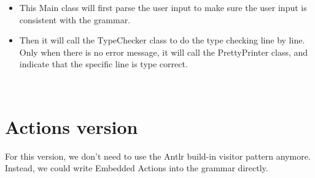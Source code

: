 \documentclass[a4paper,12pt,titlepage]{article}
\begin{document}
\begin{itemize}
	\item This Main class will first parse the user input to make sure the user input is consistent with the grammar.
	\item Then it will call the  {\footnotesize\ttfamily TypeChecker} class to do the type checking line by line. Only when there is no error message, it will call the {\footnotesize\ttfamily PrettyPrinter} class, and indicate that the specific line is type correct.
\end{itemize}
~\\


\section {Actions version}
For this version, we don't need to use the Antlr build-in visitor pattern anymore. Instead, we could write {\footnotesize\ttfamily Embedded Actions} into the grammar directly.
\end{document}
